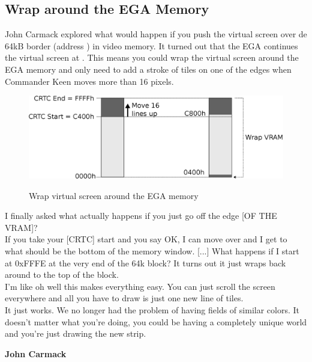 \documentclass[book.tex]{subfiles}
\begin{document}
\subsection{Wrap around the EGA Memory}
\label{section:wrap_ega_memory}
\label{section:optimize_tile}
John Carmack explored what would happen if you push the virtual screen over de 64kB border (address ) in video memory. It turned out that the EGA continues the virtual screen at . This means you could wrap the virtual screen around  the EGA memory and only need to add a stroke of tiles on one of the edges when Commander Keen moves more than 16 pixels.\\
\par
\begin{figure}[H]
  \centering
  \includegraphics[width=\textwidth]{imgs/drawings/ega_wrapping.eps}
  \label{fig:ega_wrapping}
  \caption{Wrap virtual screen around the EGA memory}
\end{figure}

\par
\begin{fancyquotes}
I finally asked what actually happens if you just go off the edge [OF THE VRAM]?\\

If you take your [CRTC] start and you say OK, I can move over and I get to what should be the bottom of the memory window. [...] What happens if I start at 0xFFFE at the very end of the 64k block? It turns out it just wraps back around to the top of the block.\\

I'm like oh well this makes everything easy. You can just scroll the screen everywhere and all you have to draw is just one new line of tiles.\\

It just works. We no longer had the problem of having fields of similar colors. It doesn't matter what you're doing, you could be having a completely unique world and you're just drawing the new strip.\\
\par
\textbf{John Carmack\protect\footnotemark}
\end{fancyquotes}\\
\addtocounter{footnote}{-1}
\par
\end{document}
